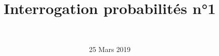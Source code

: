 \documentclass[a4paper,11pt]{exam}
\author{\ }
\date{25 Mars 2019}
\title{Interrogation probabilités n°1}
\begin{document}
%	

\maketitle




\newpage

\label{LastPage}
\setcounter{page}{1}
\maketitle



\end{document}

